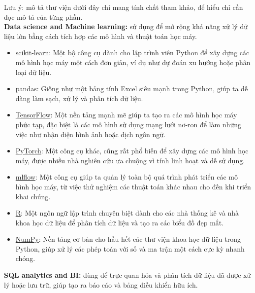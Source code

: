 \documentclass[11pt]{article}
\begin{document}
\noindent Lưu ý: mô tả thư viện dưới đây chỉ mang tính chất tham khảo, để hiểu chỉ cần đọc mô tả của từng phần. \\
\noindent \textbf{Data science and Machine learning:} sử dụng để mở rộng khả năng xử lý dữ liệu lớn bằng cách tích hợp các mô hình và thuật toán học máy.
\begin{itemize}
\item \href{https://scikit-learn.org/stable/}{scikit-learn}: Một bộ công cụ dành cho lập trình viên Python để xây dựng các mô hình học máy một cách đơn giản, ví dụ như dự đoán xu hướng hoặc phân loại dữ liệu.
\item \href{https://pandas.pydata.org/}{pandas}: Giống như một bảng tính Excel siêu mạnh trong Python, giúp ta dễ dàng làm sạch, xử lý và phân tích dữ liệu.
\item \href{https://www.tensorflow.org/}{TensorFlow}: Một nền tảng mạnh mẽ giúp ta tạo ra các mô hình học máy phức tạp, đặc biệt là các mô hình sử dụng mạng lưới nơ-ron để làm những việc như nhận diện hình ảnh hoặc dịch ngôn ngữ.
\item \href{https://pytorch.org/}{PyTorch}: Một công cụ khác, cũng rất phổ biến để xây dựng các mô hình học máy, được nhiều nhà nghiên cứu ưa chuộng vì tính linh hoạt và dễ sử dụng.
\item \href{https://mlflow.org/}{mlflow}: Một công cụ giúp ta quản lý toàn bộ quá trình phát triển các mô hình học máy, từ việc thử nghiệm các thuật toán khác nhau cho đến khi triển khai chúng.
\item \href{https://www.r-project.org/}{R}: Một ngôn ngữ lập trình chuyên biệt dành cho các nhà thống kê và nhà khoa học dữ liệu để phân tích dữ liệu và tạo ra các biểu đồ đẹp mắt.
\item \href{https://numpy.org/}{NumPy}: Nền tảng cơ bản cho hầu hết các thư viện khoa học dữ liệu trong Python, giúp xử lý các phép toán với số và ma trận một cách cực kỳ nhanh chóng.
\end{itemize}

\noindent\textbf{SQL analytics and BI:} dùng để trực quan hóa và phân tích dữ liệu đã được xử lý hoặc lưu trữ, giúp tạo ra báo cáo và bảng điều khiển hữu ích.
\end{document}
